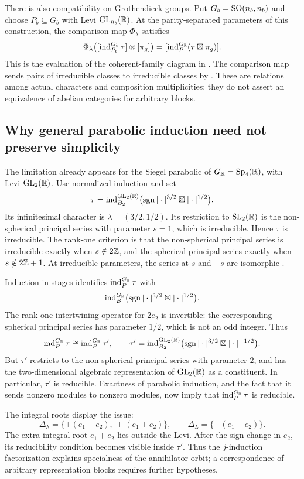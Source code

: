 There is also compatibility on Grothendieck groups. Put
$G_b=\operatorname{SO}(n_b,n_b)$ and choose $P_b\subseteq G_b$ with Levi $\operatorname{GL}_{n_b}(\mathbb{R})$.
At the parity-separated parameters of this construction, the
comparison map $\Phi_\lambda$ satisfies
\[
  \Phi_\lambda\bigl([\operatorname{ind}_{P_b}^{G_b}\tau]\otimes[\pi_g]\bigr)
  =[\operatorname{ind}_P^{G_{\mathbb{R}}}(\tau\boxtimes\pi_g)].
\]
This is the evaluation of the coherent-family diagram in
\cite[Lem.~9.4]{BMSZ22}. The comparison map sends pairs of irreducible
classes to irreducible classes by \cite[Prop.~6.16]{BMSZ22}.
These are relations among actual characters and composition
multiplicities; they do not assert an equivalence of abelian
categories for arbitrary blocks.

\subsection{Why general parabolic induction need not preserve simplicity}

The limitation already appears for the Siegel parabolic of
$G_{\mathbb{R}}=\operatorname{Sp}_4(\mathbb{R})$, with Levi $\operatorname{GL}_2(\mathbb{R})$. Use normalized
induction and set
\[
  \tau=\operatorname{ind}_{B_2}^{\operatorname{GL}_2(\mathbb{R})}
       \bigl(\operatorname{sgn}|\cdot|^{3/2}\boxtimes|\cdot|^{1/2}\bigr).
\]
Its infinitesimal character is $\lambda=(3/2,1/2)$.
Its restriction to $\operatorname{SL}_2(\mathbb{R})$ is the non-spherical principal series with
parameter $s=1$, which is irreducible. Hence $\tau$ is irreducible.
The rank-one criterion is that the non-spherical principal series is
irreducible exactly when $s\notin2\mathbb{Z}$, and the spherical principal
series exactly when $s\notin2\mathbb{Z}+1$. At irreducible parameters,
the series at $s$ and $-s$ are isomorphic
\cite[\S9.1, especially (5)]{Etingof2023SL2}.

Induction in stages identifies $\operatorname{ind}_P^{G_{\mathbb{R}}}\tau$ with
\[
  \operatorname{ind}_B^{G_{\mathbb{R}}}
       \bigl(\operatorname{sgn}|\cdot|^{3/2}\boxtimes|\cdot|^{1/2}\bigr).
\]
The rank-one intertwining operator for $2e_2$ is invertible: the
corresponding spherical principal series has parameter $1/2$,
which is not an odd integer. Thus
\[
  \operatorname{ind}_P^{G_{\mathbb{R}}}\tau\cong \operatorname{ind}_P^{G_{\mathbb{R}}}\tau',\qquad
  \tau'=\operatorname{ind}_{B_2}^{\operatorname{GL}_2(\mathbb{R})}
       \bigl(\operatorname{sgn}|\cdot|^{3/2}\boxtimes|\cdot|^{-1/2}\bigr).
\]
But $\tau'$ restricts to the non-spherical principal series with parameter $2$,
and has the two-dimensional algebraic representation of $\operatorname{GL}_2(\mathbb{R})$
as a constituent. In particular, $\tau'$ is reducible. Exactness of
parabolic induction, and the fact
that it sends nonzero modules to nonzero modules, now imply that
$\operatorname{ind}_P^{G_{\mathbb{R}}}\tau$ is reducible.

The integral roots display the issue:
\[
  \Delta_\lambda
  =\{\pm(e_1-e_2),\,\pm(e_1+e_2)\},\qquad
  \Delta_L=\{\pm(e_1-e_2)\}.
\]
The extra integral root $e_1+e_2$ lies outside the Levi. After the
sign change in $e_2$, its reducibility condition becomes visible
inside $\tau'$. Thus the $j$-induction factorization explains
specialness of the annihilator orbit; a correspondence of arbitrary
representation blocks requires further hypotheses.
